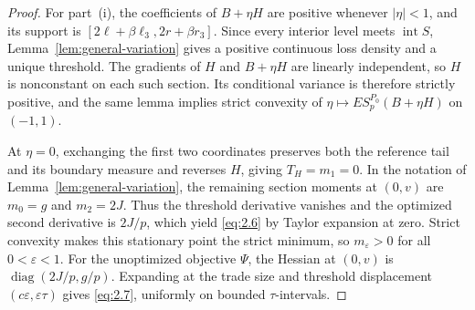\begin{proof}
For part~(i), the coefficients of \(B+\eta H\) are positive whenever \(|\eta|<1\), and its support is \([2\ell+\beta\ell_3,2r+\beta r_3]\). Since every interior level meets \(\operatorname{int}S\), Lemma~\ref{lem:general-variation} gives a positive continuous loss density and a unique threshold. The gradients of \(H\) and \(B+\eta H\) are linearly independent, so \(H\) is nonconstant on each such section. Its conditional variance is therefore strictly positive, and the same lemma implies strict convexity of \(\eta\mapsto ES_p^{P_0}(B+\eta H)\) on \((-1,1)\).

At \(\eta=0\), exchanging the first two coordinates preserves both the reference tail and its boundary measure and reverses \(H\), giving \(T_H=m_1=0\). In the notation of Lemma~\ref{lem:general-variation}, the remaining section moments at \((0,v)\) are \(m_0=g\) and \(m_2=2J\). Thus the threshold derivative vanishes and the optimized second derivative is \(2J/p\), which yield \eqref{eq:2.6} by Taylor expansion at zero. Strict convexity makes this stationary point the strict minimum, so \(m_\varepsilon>0\) for all \(0<\varepsilon<1\). For the unoptimized objective \(\Psi\), the Hessian at \((0,v)\) is \(\operatorname{diag}(2J/p,g/p)\). Expanding at the trade size and threshold displacement \((c\varepsilon,\varepsilon\tau)\) gives \eqref{eq:2.7}, uniformly on bounded \(\tau\)-intervals.


\end{proof}

